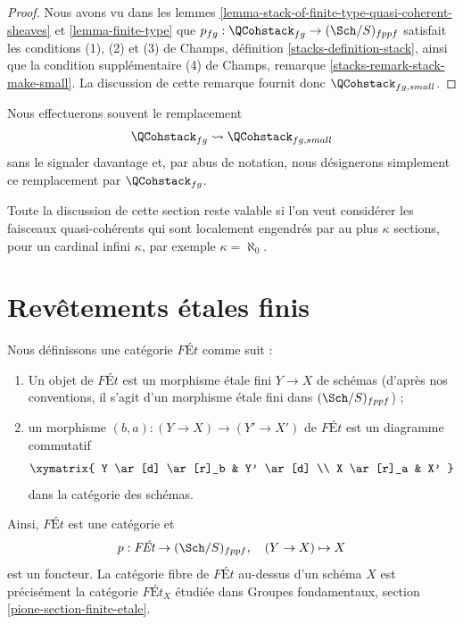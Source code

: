 \begin{proof}
Nous avons vu dans les
lemmes \ref{lemma-stack-of-finite-type-quasi-coherent-sheaves} et
\ref{lemma-finite-type}
que $p_{fg} : \QCohstack_{fg} \to (\Sch/S)_{fppf}$
satisfait les conditions (1), (2) et (3) de
Champs, définition \ref{stacks-definition-stack},
ainsi que la condition supplémentaire (4) de
Champs, remarque \ref{stacks-remark-stack-make-small}.
La discussion de cette remarque fournit donc $\QCohstack_{fg, small}$.
\end{proof}

\noindent
Nous effectuerons souvent le remplacement
$$
\QCohstack_{fg} \leadsto \QCohstack_{fg, small}
$$
sans le signaler davantage et, par abus de notation, nous désignerons
simplement ce remplacement par $\QCohstack_{fg}$.

\begin{remark}
\label{remark-higher-rank}
Toute la discussion de cette section reste valable
si l'on veut considérer les
faisceaux quasi-cohérents qui sont localement engendrés par au plus $\kappa$
sections, pour un cardinal infini $\kappa$, par exemple $\kappa = \aleph_0$.
\end{remark}





\section{Revêtements étales finis}
\label{section-finite-etale}

\noindent
Nous définissons une catégorie $\textit{F\'Et}$ comme suit :
\begin{enumerate}
\item Un objet de $\textit{F\'Et}$ est un morphisme étale fini $Y \to X$
de schémas (d'après nos conventions, il s'agit d'un morphisme étale fini
dans $(\Sch/S)_{fppf}$) ;
\item un morphisme $(b, a) : (Y \to X) \to (Y' \to X')$ de $\textit{F\'Et}$
est un diagramme commutatif
$$
\xymatrix{
Y \ar[d] \ar[r]_b & Y' \ar[d] \\
X \ar[r]_a & X'
}
$$
dans la catégorie des schémas.
\end{enumerate}
Ainsi, $\textit{F\'Et}$ est une catégorie et
$$
p : \textit{F\'Et} \to (\Sch/S)_{fppf},
\quad
(Y \to X) \mapsto X
$$
est un foncteur. La catégorie fibre de $\textit{F\'Et}$ au-dessus
d'un schéma $X$ est précisément la catégorie $\textit{F\'Et}_X$ étudiée dans
Groupes fondamentaux, section \ref{pione-section-finite-etale}.

